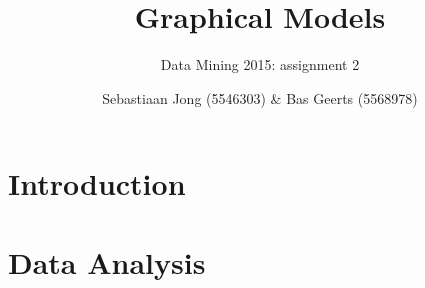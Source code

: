 \documentclass[a4paper,12pt]{scrartcl}
\begin{document}
\title{Graphical Models}
\subtitle{Data Mining 2015: assignment 2}
\author{Sebastiaan Jong (5546303) \& Bas Geerts (5568978)}
\date{}
\maketitle
\section{Introduction}
\section{Data Analysis}
\end{document}

